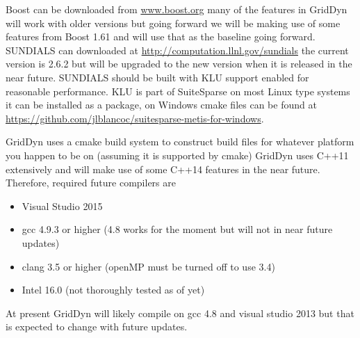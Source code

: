 \documentclass[12pt]{article} %
\begin{document}
Boost can be downloaded from \url{www.boost.org}  many of the features in GridDyn will work with older versions but going forward we will be making use of some features from Boost 1.61 and will use that as the baseline going forward.    SUNDIALS can downloaded at \url{http://computation.llnl.gov/sundials} the current version is 2.6.2 but will be upgraded to the new version when it is released in the near future.  SUNDIALS should be built with KLU support enabled for reasonable performance.  KLU is part of SuiteSparse on most Linux type systems it can be installed as a package, on Windows  cmake files can be found at \url{https://github.com/jlblancoc/suitesparse-metis-for-windows}.  

GridDyn uses a cmake build system to construct build files for whatever platform you happen to be on (assuming it is supported by cmake)  
GridDyn uses C++11 extensively and will make use of some C++14 features in the near future.    Therefore, required future compilers are 
\begin{itemize}
\item Visual Studio 2015
\item gcc 4.9.3 or higher (4.8 works for the moment but will not in near future updates)
\item clang 3.5 or higher (openMP must be turned off to use 3.4)
\item Intel 16.0 (not thoroughly tested as of yet)
\end{itemize}

At present GridDyn will likely compile on gcc 4.8 and visual studio 2013 but that is expected to change with future updates.  
\end{document}
